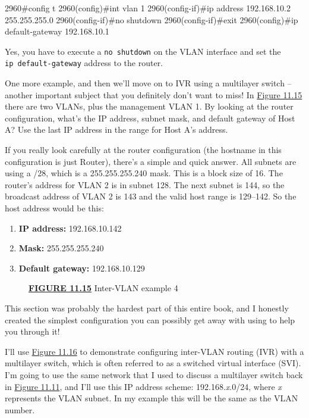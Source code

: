\begin{cli}
2960#config t
2960(config)#int vlan 1
2960(config-if)#ip address 192.168.10.2 255.255.255.0
2960(config-if)#no shutdown
2960(config-if)#exit
2960(config)#ip default-gateway 192.168.10.1
\end{cli}

Yes, you have to execute a \texttt{no\ shutdown} on the VLAN interface
and set the \texttt{ip\ default-gateway} address to the router.

One more example, and then we'll move on to IVR using a multilayer
switch -- another important subject that you definitely don't want to
miss! In \protect\hyperlink{c11.xhtmlux5cux23figure11-15}{Figure 11.15}
there are two VLANs, plus the management VLAN 1. By looking at the
router configuration, what's the IP address, subnet mask, and default
gateway of Host A? Use the last IP address in the range for Host A's
address.

If you really look carefully at the router configuration (the hostname
in this configuration is just Router), there's a simple and quick
answer. All subnets are using a /28, which is a 255.255.255.240 mask.
This is a block size of 16. The router's address for VLAN 2 is in subnet
128. The next subnet is 144, so the broadcast address of VLAN 2 is 143
and the valid host range is 129--142. So the host address would be this:

\begin{enumerate}
\item
  \textbf{IP address:} 192.168.10.142
\item
  \textbf{Mask:} 255.255.255.240
\item
  \textbf{Default gateway:} 192.168.10.129
\end{enumerate}



\begin{figure}
\centering
\caption{{\protect\hyperlink{c11.xhtmlux5cux23figureanchor11-15}{\textbf{FIGURE
11.15}} Inter-VLAN example 4}}
\end{figure}

This section was probably the hardest part of this entire book, and I
honestly created the simplest configuration you can possibly get away
with using to help you through it!

I'll use \protect\hyperlink{c11.xhtmlux5cux23figure11-16}{Figure 11.16}
to demonstrate configuring inter-VLAN routing (IVR) with a multi­layer
switch, which is often referred to as a switched virtual interface
(SVI). I'm going to use the same network that I used to discuss a
multilayer switch back in
\protect\hyperlink{c11.xhtmlux5cux23figure11-11}{Figure 11.11}, and I'll
use this IP address scheme: 192.168.\emph{x}.0/24, where \emph{x}
represents the VLAN subnet. In my example this will be the same as the
VLAN number.

